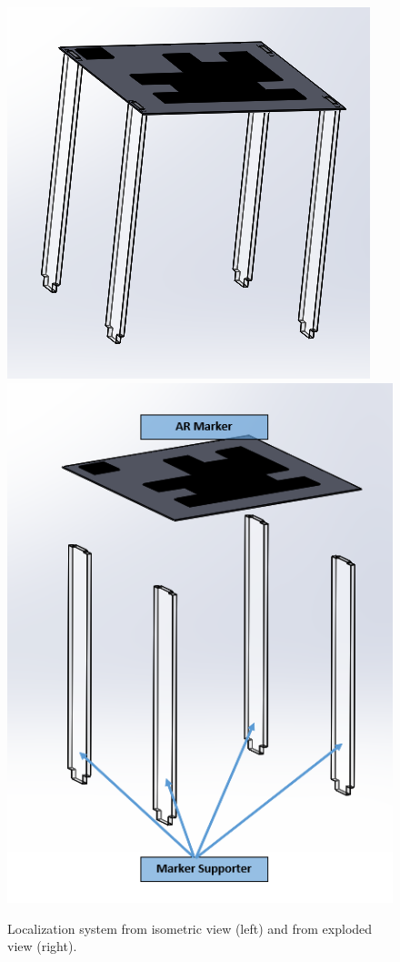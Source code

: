 \begin{figure}
\centering
\includegraphics[width=0.9\columnwidth]{hardware/CAD/Localization System/Localization.PNG}
\includegraphics[width=0.9\columnwidth]{hardware/CAD/Localization System/Localization_Exploded.PNG}
\caption{Localization system from isometric view (left) and from exploded view (right).}
\label{fig:localization-diagram}
\end{figure}

